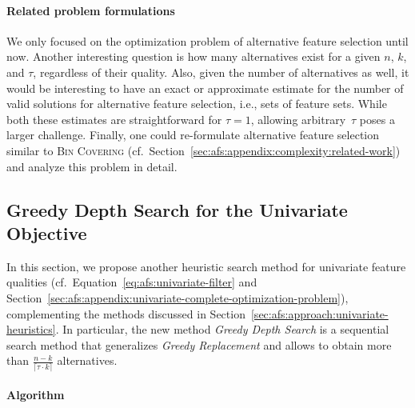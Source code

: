 \documentclass{article}
\theoremstyle{definition}
\begin{document}
\paragraph{Related problem formulations}

We only focused on the optimization problem of alternative feature selection until now.
Another interesting question is how many alternatives exist for a given $n$, $k$, and $\tau$, regardless of their quality.
Also, given the number of alternatives as well, it would be interesting to have an exact or approximate estimate for the number of valid solutions for alternative feature selection, i.e., sets of feature sets.
While both these estimates are straightforward for $\tau = 1$, allowing arbitrary~$\tau$ poses a larger challenge.
Finally, one could re-formulate alternative feature selection similar to \textsc{Bin Covering} (cf.~Section~\ref{sec:afs:appendix:complexity:related-work}) and analyze this problem in detail.

\subsection{Greedy Depth Search for the Univariate Objective}
\label{sec:afs:appendix:greedy-depth}

In this section, we propose another heuristic search method for univariate feature qualities (cf.~Equation~\ref{eq:afs:univariate-filter} and Section~\ref{sec:afs:appendix:univariate-complete-optimization-problem}), complementing the methods discussed in Section~\ref{sec:afs:approach:univariate-heuristics}.
In particular, the new method \emph{Greedy Depth Search} is a sequential search method that generalizes \emph{Greedy Replacement} and allows to obtain more than $\frac{n - k}{\lceil \tau \cdot k \rceil}$ alternatives.

\paragraph{Algorithm}
\end{document}
